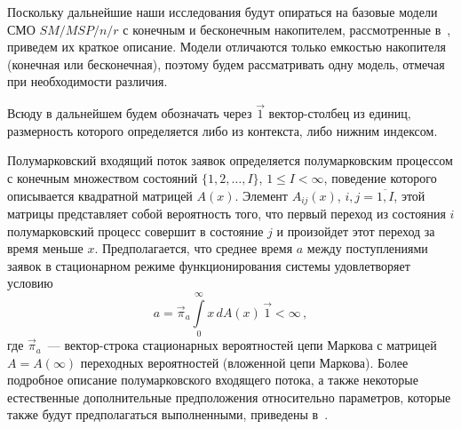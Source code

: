 \begin{multicols}{2}
{}

Поскольку дальнейшие наши исследования будут опираться на базовые модели СМО $SM/MSP/n/r$
с конечным и бесконечным накопителем, рассмотренные в~\cite{PSC07_1, PC04}, приведем их краткое описание.
Модели отличаются только емкостью накопителя (конечная или бесконечная),
поэтому будем рассматривать одну модель, отмечая при необходимости различия.

Всюду в дальнейшем будем обозначать через $\vec1$ вектор-столбец из единиц,
размерность которого определяется либо из контекста, либо нижним индексом.

Полумарковский входящий поток заявок определяется полумарковским
процессом с конечным множеством состояний
$\{1,2,\ldots,I\}$, $1\le I<\infty$, поведение которого
описывается квадратной матрицей $A(x)$.
Элемент $A_{ij}(x)$, $i,j=\overline{1,I}$, этой матрицы
представляет собой вероятность того, что первый переход из
состояния $i$ полумарковский процесс совершит в состояние $j$ и
произойдет этот переход за время меньше $x$.
Предполагается, что среднее время $a$ между поступлениями заявок
в стационарном режиме функционирования системы удовлетворяет
условию
$$
a = \vec\pi_a \int\limits_0^\infty x\, dA(x)\, \vec1 < \infty\,,
$$
где $\vec\pi_a$~--- вектор-строка стационарных вероятностей цепи
Маркова с матрицей $A=A(\infty)$ переходных вероятностей
(вложенной цепи Маркова).
Более подробное описание полумарковского входящего потока, а
также некоторые естественные дополнительные предположения
относительно параметров, которые также будут предполагаться
выполненными, приведены в~\cite{PC04}.


\end{multicols}
